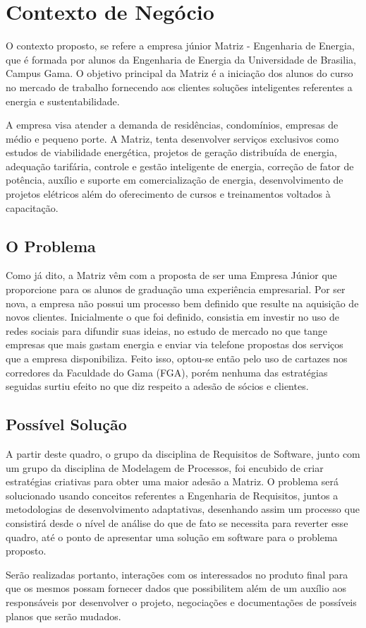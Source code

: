 \chapter[Contexto de Negócio]{Contexto de Negócio}

O contexto proposto, se refere a empresa júnior Matriz - Engenharia de Energia, que é 
formada por alunos da Engenharia de Energia da Universidade de Brasilia, Campus Gama. 
O objetivo principal da Matriz é a iniciação dos alunos do curso no mercado de trabalho 
fornecendo aos clientes soluções inteligentes referentes a energia e sustentabilidade.

A empresa visa atender a demanda de residências, condomínios, empresas de médio 
e pequeno porte. A Matriz, tenta desenvolver serviços exclusivos como estudos de
viabilidade energética, projetos de geração distribuída de energia, adequação tarifária, 
controle e gestão inteligente de energia, correção de fator de potência, auxílio e suporte
em comercialização de energia, desenvolvimento de projetos elétricos além do oferecimento 
de cursos e treinamentos voltados à capacitação.

\section{O Problema}
Como já dito, a Matriz vêm com a proposta de ser uma Empresa Júnior que proporcione para 
os alunos de graduação uma experiência empresarial. Por ser nova, a empresa não possui 
um processo bem definido que resulte na aquisição de novos clientes. Inicialmente o que 
foi definido, consistia em investir no uso de redes sociais para difundir suas ideias, 
no estudo de mercado no que tange empresas que mais gastam energia e enviar via telefone
propostas dos serviços que a empresa disponibiliza. Feito isso, optou-se então pelo uso de
cartazes nos corredores da Faculdade do Gama (FGA), porém nenhuma das estratégias seguidas
surtiu efeito no que diz respeito a adesão de sócios e clientes.

\section{Possível Solução}
A partir deste quadro, o grupo da disciplina de Requisitos de Software, junto com um 
grupo da disciplina de Modelagem de Processos, foi encubido de criar estratégias 
criativas para obter uma maior adesão a Matriz. O problema será solucionado 
usando conceitos referentes a Engenharia de Requisitos, juntos a metodologias de 
desenvolvimento adaptativas, desenhando assim um processo que consistirá desde o nível 
de análise do que de fato se necessita para reverter esse quadro, até o ponto de 
apresentar uma solução em software para o problema proposto.

Serão realizadas portanto, interações com os interessados no produto final para que 
os mesmos possam fornecer dados que possibilitem além de um auxílio aos responsáveis 
por desenvolver o projeto, negociações e documentações de possíveis planos que serão
mudados.


